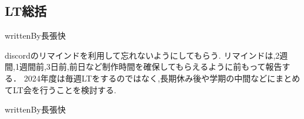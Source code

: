 \subsection*{LT総括}

writtenBy{\kensuiChief}{長張}{快}

discordのリマインドを利用して忘れないようにしてもらう.
リマインドは,2週間,1週間前,3日前,前日など制作時間を確保してもらえるように前もって報告する．
2024年度は毎週LTをするのではなく,長期休み後や学期の中間などにまとめてLT会を行うことを検討する.

writtenBy{\kensuiStaff}{長張}{快}
